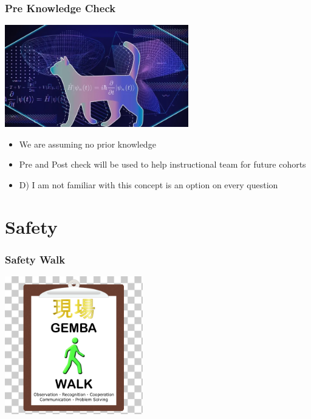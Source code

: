\documentclass{beamer}
\begin{document}
\begin{frame}\frametitle{Pre Knowledge Check}
\begin{center}
\includegraphics[width=8cm]{fig/precat.jpg}
\end{center}

\vspace{0.25cm}
\begin{itemize}
\item We are assuming no prior knowledge
\item Pre and Post check will be used to help instructional team for future cohorts
\item D) I am not familiar with this concept is an option on every question
\end{itemize}


\end{frame}



\section{Safety}

\begin{frame}\frametitle{Safety Walk}
\begin{center}
\includegraphics[width=6cm]{fig/gemba.png}
\end{center}
\end{frame}
\end{document}

